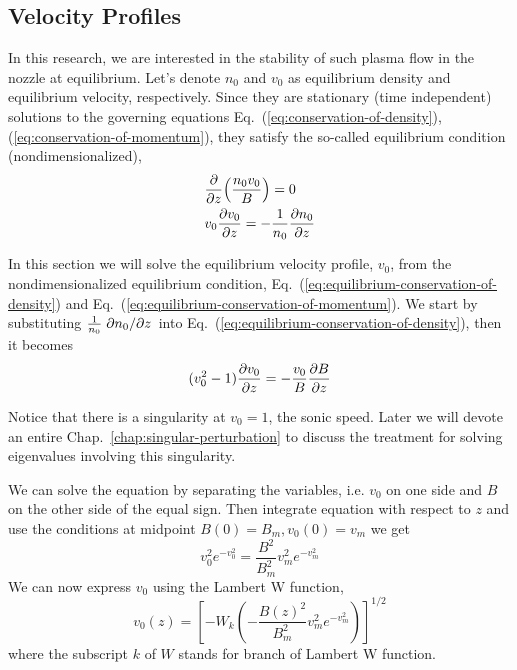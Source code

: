 \subsection{Velocity Profiles}
In this research, we are interested in the stability of such plasma flow in the nozzle at equilibrium. Let's denote $n_0$ and $v_0$ as equilibrium density and equilibrium velocity, respectively. Since they are stationary (time independent) solutions to the governing equations Eq.~(\ref{eq:conservation-of-density}), (\ref{eq:conservation-of-momentum}), they satisfy the so-called equilibrium condition (nondimensionalized),
\begin{align}
	 & \pdv{z}(\frac{n_0v_0}{B}) = 0 \label{eq:equilibrium-conservation-of-density}                 \\
	 & v_0\pdv{v_0}{z} = -\frac{1}{n_0}\pdv{n_0}{z} \label{eq:equilibrium-conservation-of-momentum}
\end{align}

In this section we will solve the equilibrium velocity profile, $v_0$, from the nondimensionalized equilibrium condition, Eq.~(\ref{eq:equilibrium-conservation-of-density}) and Eq.~(\ref{eq:equilibrium-conservation-of-momentum}).
We start by substituting $\frac{1}{n_0}\pdv*{n_0}{z}$ into Eq.~(\ref{eq:equilibrium-conservation-of-density}), then it becomes
\begin{equation}
	(v_0^2-1)\pdv{v_0}{z} = -\frac{v_0}{B}\pdv{B}{z}
\end{equation}

Notice that there is a singularity at $v_0=1$, the sonic speed. Later we will devote an entire Chap.~\ref{chap:singular-perturbation} to discuss the treatment for solving eigenvalues involving this singularity.

We can solve the equation by separating the variables, i.e. $v_0$ on one side and $B$ on the other side of the equal sign. Then integrate equation with respect to $z$ and use the conditions at midpoint $B(0)=B_m, v_0(0)=v_m$ we get
\begin{equation}
	v_0^2e^{-v_0^2} = \frac{B^2}{B_m^2}v_m^2e^{-v_m^2}
\end{equation}
We can now express $v_0$ using the Lambert W function,
\begin{equation}
	v_0(z) = \left[ -W_k\left(-\frac{B(z)^2}{B_m^2}v_m^2e^{-v_m^2}\right) \right]^{1/2}
	\label{eq:velocity-profile}
\end{equation}
where the subscript $k$ of $W$ stands for branch of Lambert W function.

